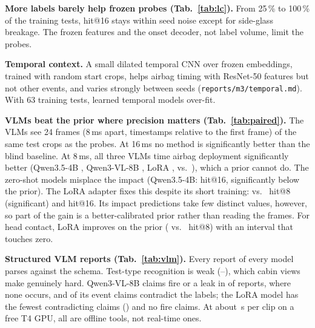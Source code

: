 \documentclass[10pt,twocolumn]{article}
\begin{document}
\textbf{More labels barely help frozen probes (Tab.~\ref{tab:lc}).} From 25\,\% to 100\,\% of
the training tests, hit@16 stays within seed noise except for side-glass breakage. The frozen
features and the onset decoder, not label volume, limit the probes.

\begin{table}[t]\centering\small
\caption{Learning curve of the SigLIP 2-B probes (t0 unknown, hit@16, mean $\pm$ std over
three subsets).}\label{tab:lc}

\end{table}

\textbf{Temporal context.} A small dilated temporal CNN over frozen embeddings, trained with
random start crops, helps airbag timing with ResNet-50 features but not other events, and varies
strongly between seeds (\texttt{reports/m3/temporal.md}). With 63 training tests, learned
temporal models over-fit.

\textbf{VLMs beat the prior where precision matters (Tab.~\ref{tab:paired}).} The VLMs see 24
frames (8\,ms apart, timestamps relative to the first frame) of the same test crops as the
probes. At 16\,ms no method is significantly better than the blind baseline. At 8\,ms, all three
VLMs time airbag deployment significantly better (Qwen3.5-4B \ZsAirbagEight{}, Qwen3-VL-8B
\VlAirbagEight{}, LoRA \LoraAirbagEight{}, vs.\ \BlindAirbagEight{}), which a prior cannot do.
The zero-shot models misplace the impact (Qwen3.5-4B: \ZsImpactSixteen{} hit@16, significantly
below the prior). The LoRA adapter fixes this despite its short training: \LoraImpactEight{} vs.\
\BlindImpactEight{} hit@8 (significant) and \LoraImpactSixteen{} hit@16. Its impact predictions
take few distinct values, however, so part of the gain is a better-calibrated prior rather than
reading the frames. For head contact, LoRA improves on the prior (\LoraHeadEight{} vs.\
\BlindHeadEight{} hit@8) with an interval that touches zero.

\begin{table}[t]\centering\small
\caption{Hit@8 and hit@16 on the same test clips, t0 unknown. $^{\uparrow}$/$^{\downarrow}$:
paired difference to the blind baseline whose 95\,\% bootstrap interval (over tests) excludes
zero. Full table with intervals: \texttt{reports/m4/paired.md}.}\label{tab:paired}

\end{table}

\textbf{Structured VLM reports (Tab.~\ref{tab:vlm}).} Every report of every model parses against
the schema. Test-type recognition is weak (\VlmTestType{}--\VlTestType{}), which cabin views make
genuinely hard. Qwen3-VL-8B claims fire or a leak in \VlFire{} of reports, where none occurs, and
\VlContradict{} of its event claims contradict the labels; the LoRA model has the fewest
contradicting claims (\LoraContradict{}) and no fire claims. At about \VlmLatency{}\,s per clip
on a free T4 GPU, all are offline tools, not real-time ones.
\end{document}

